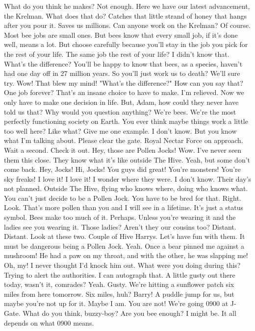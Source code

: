 \documentclass[a4paper,12pt]{article}
\begin{document}
What do you think he makes?
Not enough.
Here we have our latest advancement, the Krelman.
What does that do?
Catches that little strand of honey that hangs after you pour it.
Saves us millions.
Can anyone work on the Krelman?
Of course. Most bee jobs are small ones.
But bees know that every small job, if it's done well, means a lot.
But choose carefully because you'll stay in the job you pick for the rest of your life.
The same job the rest of your life? I didn't know that.
What's the difference?
You'll be happy to know that bees, as a species, haven't had one day off in 27 million years.
So you'll just work us to death?
We'll sure try.
Wow! That blew my mind!
"What's the difference?"
How can you say that?
One job forever?
That's an insane choice to have to make.
I'm relieved. Now we only have to make one decision in life.
But, Adam, how could they never have told us that?
Why would you question anything? We're bees.
We're the most perfectly functioning society on Earth.
You ever think maybe things work a little too well here?
Like what? Give me one example.
I don't know. But you know what I'm talking about.
Please clear the gate. Royal Nectar Force on approach.
Wait a second. Check it out.
Hey, those are Pollen Jocks!
Wow.
I've never seen them this close.
They know what it's like outside The Hive.
Yeah, but some don't come back.
Hey, Jocks!
Hi, Jocks!
You guys did great!
You're monsters!
You're sky freaks! I love it! I love it!
I wonder where they were.
I don't know.
Their day's not planned.
Outside The Hive, flying who knows where, doing who knows what.
You can't just decide to be a Pollen Jock. You have to be bred for that.
Right.
Look. That's more pollen than you and I will see in a lifetime.
It's just a status symbol.
Bees make too much of it.
Perhaps. Unless you're wearing it and the ladies see you wearing it.
Those ladies?
Aren't they our cousins too?
Distant. Distant.
Look at these two.
Couple of Hive Harrys.
Let's have fun with them.
It must be dangerous being a Pollen Jock.
Yeah. Once a bear pinned me against a mushroom!
He had a paw on my throat, and with the other, he was slapping me!
Oh, my!
I never thought I'd knock him out.
What were you doing during this?
Trying to alert the authorities.
I can autograph that.
A little gusty out there today, wasn't it, comrades?
Yeah. Gusty.
We're hitting a sunflower patch six miles from here tomorrow.
Six miles, huh?
Barry!
A puddle jump for us, but maybe you're not up for it.
Maybe I am.
You are not!
We're going 0900 at J-Gate.
What do you think, buzzy-boy?
Are you bee enough?
I might be. It all depends on what 0900 means.
\end{document}
